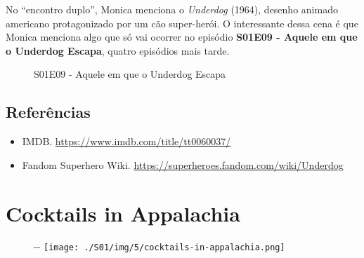 No ``encontro duplo'', Monica menciona o \emph{Underdog} (1964), desenho
animado americano protagonizado por um cão super-herói. O interessante
dessa cena é que Monica menciona algo que só vai ocorrer no episódio
\textbf{\textcolor{primarycolor}{S01E09 - Aquele em que o Underdog Escapa}},
quatro episódios mais tarde.

\begin{figure}
  \centering
    \caption{S01E09 - Aquele em que o Underdog Escapa\label{fig:s01-e09-aquele-em-que-o-underdog-escapa}}
\end{figure}

\hypertarget{referuxeancias-1}{%
\subsection{Referências}\label{referuxeancias-1}}

\begin{itemize}
\tightlist
\item
  \sloppy IMDB. \url{https://www.imdb.com/title/tt0060037/}
\item
  \sloppy Fandom Superhero Wiki. \url{https://superheroes.fandom.com/wiki/Underdog}
\end{itemize}

\hypertarget{cocktails-in-appalachia}{%
\section{Cocktails in Appalachia}\label{cocktails-in-appalachia}}

\begin{figure}[!ht]
  \begin{adjustwidth}{-\oddsidemargin-1in}{-\rightmargin}
    \centering
    \texttt{[image: ./S01/img/5/cocktails-in-appalachia.png]}
  \end{adjustwidth}
\end{figure}

